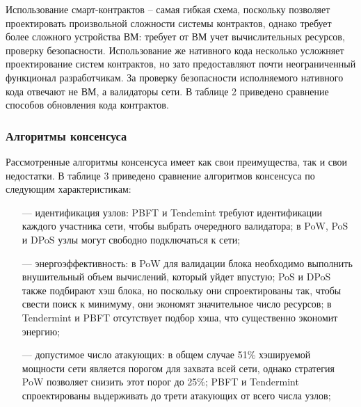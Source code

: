 Использование смарт-контрактов -- самая гибкая схема, поскольку позволяет проектировать произвольной сложности системы контрактов, однако требует более сложного устройства ВМ: требует от ВМ учет вычислительных ресурсов, проверку безопасности. Использование же нативного кода несколько усложняет проектирование систем контрактов, но зато предоставляют почти неограниченный функционал разработчикам. За проверку безопасности исполняемого нативного кода отвечают не ВМ, а валидаторы сети. В таблице 2 приведено сравнение способов обновления кода контрактов.

\begin{table}[h!]
	\captionsetup{justification=raggedleft,singlelinecheck=off}
	\caption{Сравнение способов обновления кода контрактов}
\end{table}


\subsubsection{Алгоритмы консенсуса}

Рассмотренные алгоритмы консенсуса имеет как свои преимущества, так и свои недостатки. В таблице 3 приведено сравнение алгоритмов консенсуса по следующим характеристикам:
\begin{enumerate}[leftmargin=1.6\parindent]
	\item[---] идентификация узлов: PBFT и Tendemint требуют идентификации каждого участника сети, чтобы выбрать очередного валидатора; в PoW, PoS и DPoS узлы могут свободно подключаться к сети;
	\item[---] энергоэффективность: в PoW для валидации блока необходимо выполнить внушительный объем вычислений, который уйдет впустую; PoS и DPoS также подбирают хэш блока, но поскольку они спроектированы так, чтобы свести поиск к минимуму, они экономят значительное число ресурсов; в Tendermint и PBFT отсутствует подбор хэша, что существенно экономит энергию;
	\item[---] допустимое число атакующих: в общем случае 51\% хэшируемой мощности сети является порогом для захвата всей сети, однако стратегия PoW позволяет снизить этот порог до 25\%; PBFT и Tendermint спроектированы выдерживать до трети атакующих от всего числа узлов; 
\end{enumerate}

